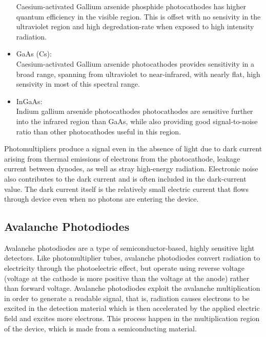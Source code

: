 \begin{itemize}
Caesium-activated Gallium arsenide phosphide photocathodes has higher quantum efficiency in the visible region. This is offset with no sensivity in the ultraviolet region and high degredation-rate when exposed to high intensity radiation.
\\
\item GaAs (Cs):\\
Caesium-activated Gallium arsenide photocathodes provides sensitivity in a broad range, spanning from ultraviolet to near-infrared, with nearly flat, high sensivity in most of this spectral range.
\\
\item InGaAs:\\ 
Indium gallium arsenide photocathodes photocathodes are sensitive further into the infrared region than GaAs, while also providing good signal-to-noise ratio than other photocathodes useful in this region.

\end{itemize}

Photomultipliers produce a signal even in the absence of light due to dark current arising from thermal emissions of electrons from the photocathode, leakage current between dynodes, as well as stray high-energy radiation. Electronic noise also contributes to the dark current and is often included in the dark-current value. The dark current itself is the relatively small electric current that flows through device even when no photons are entering the device. 

\subsection{Avalanche Photodiodes}

Avalanche photodiodes are a type of semiconductor-based, highly sensitive light detectors. Like photomultiplier tubes, avalanche photodiodes convert radiation to electricity through the photoelectric effect, but operate using reverse voltage (voltage at the cathode is more positive than the voltage at the anode) rather than forward voltage. Avalanche photodiodes exploit the avalanche multiplication in order to generate a readable signal, that is, radiation causes electrons to be excited in the detection material which is then accelerated by the applied electric field and excites more electrons. This process happen in the multiplication region of the device, which is made from a semiconducting material.\\

